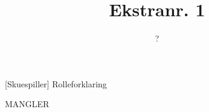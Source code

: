\documentclass[a4paper,11pt]{article}
\title{Ekstranr. 1}
\author{?}
\begin{document}
\maketitle

\begin{roles}
[Skuespiller] Rolleforklaring
\end{roles}

\begin{song}
MANGLER
\end{song}
\end{document}
